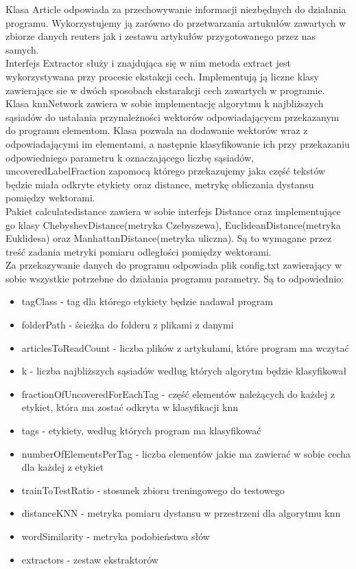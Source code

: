 \documentclass{classrep}
\begin{document}
Klasa Article odpowiada za przechowywanie informacji niezbędnych do działania programu. Wykorzystujemy ją zarówno do przetwarzania artukułów zawartych w zbiorze danych reuters jak i zestawu artykułów przygotowanego przez nas samych.\\
Interfejs Extractor służy i znajdująca się w nim metoda extract jest wykorzystywana przy procesie ekstakcji cech. Implementują ją liczne klasy zawierające sie w dwóch sposobach ekstarakcji cech zawartych w programie.\\
Klasa knnNetwork zawiera w sobie implementację algorytmu k najbliższych sąsiadów do ustalania przynależności wektorów odpowiadającycm przekazanym do programu elementom. Klasa pozwala na dodawanie wektorów wraz z odpowiadającymi im elementami, a następnie klasyfikowanie ich przy przekazaniu odpowiedniego parametru k oznaczającego liczbę sąsiadów, uncoveredLabelFraction zapomocą którego przekazujemy jaka część tekstów będzie miała odkryte etykiety oraz distance, metrykę obliczania dystansu pomiędzy wektorami.\\
Pakiet calculatedistance zawiera w sobie interfejs Distance oraz implementujące go klasy ChebyshevDistance(metryka Czebyszewa), EuclideanDistance(metryka Euklidesa) oraz ManhattanDistance(metryka uliczna). Są to wymagane przez treść zadania metryki pomiaru odległości pomiędzy wektorami.\\
Za przekazywanie danych do programu odpowiada plik config.txt zawierający w sobie wszystkie potrzebne do działania programu parametry. Są to odpowiednio:
\begin{itemize}
	\item tagClass - tag dla którego etykiety będzie nadawał program
	\item folderPath - ścieżka do folderu z plikami z danymi
	\item articlesToReadCount - liczba plików z artykułami, które program ma wczytać
	\item k - liczba najbliższych sąsiadów według których algorytm będzie klasyfikował
	\item fractionOfUncoveredForEachTag - część elementów należących do każdej z etykiet, która ma zostać odkryta w klasyfikacji knn
	\item tags - etykiety, według których program ma klasyfikować
	\item numberOfElementsPerTag - liczba elementów jakie ma zawierać w sobie cecha dla każdej z etykiet
	\item trainToTestRatio - stosunek zbioru treningowego do testowego
	\item distanceKNN - metryka pomiaru dystansu w przestrzeni dla algorytmu knn
	\item wordSimilarity - metryka podobieństwa słów
	\item extractors - zestaw ekstraktorów
\end{itemize}
\end{document}
